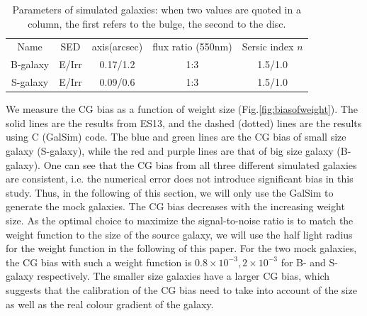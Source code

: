 \documentclass[useAMS,usenatbib]{mn2e}
\begin{document}
%
\begin{center}
\begin{table}
\begin{tabular}{|c|c|c|c|c|}
\hline\hline
Name  &SED  &axis(arcsec) &flux ratio (550nm)  &Sersic index $n$ \\
B-galaxy  &E/Irr &0.17/1.2  &1:3  &1.5/1.0 \\
S-galaxy  &E/Irr &0.09/0.6  &1:3  &1.5/1.0 \\
\hline
\end{tabular}
\caption{\label{table:galaxy model} Parameters of simulated galaxies:
  when two values are quoted in a column, the first refers to the
  bulge, the second to the disc.}
\end{table}
\end{center}
%

We measure the CG bias as a function of weight size
(Fig.\ref{fig:biasofweight}). The solid lines are the results from
ES13, and the dashed (dotted) lines are the results using C (GalSim)
code. The blue and green lines are the CG bias of small size galaxy
(S-galaxy), while the red and purple lines are that of big size galaxy
(B-galaxy). One can see that the CG bias from all three different
simulated galaxies are consistent, i.e. the numerical error does not
introduce significant bias in this study. Thus, in the following of
this section, we will only use the GalSim to generate the mock
galaxies.
%
The CG bias decreases with the increasing weight size.  As the optimal
choice to maximize the signal-to-noise ratio is to match the weight
function to the size of the source galaxy, we will use the half light
radius for the weight function in the following of this paper. For the
two mock galaxies, the CG bias with such a weight function is
$0.8\times10^{-3}, 2\times10^{-3}$ for B- and S-galaxy respectively.
The smaller size galaxies have a larger CG bias, which suggests that
the calibration of the CG bias need to take into account of the size
as well as the real colour gradient of the galaxy.
\end{document}
